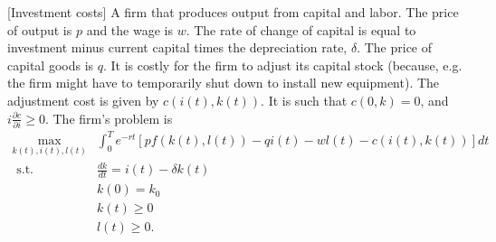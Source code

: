\begin{example}\label{ex:inv}[Investment costs]
  A firm that produces output from capital and labor. The price of
  output is $p$ and the wage is $w$. The rate of change of capital is
  equal to investment minus current capital times the depreciation
  rate, $\delta$. The price of capital goods is $q$. It is costly for
  the firm to adjust its capital stock (because, e.g. the firm might
  have to temporarily shut down to install new equipment). The
  adjustment cost is given by $c(i(t),k(t))$. It is such that $c(0,k)
  = 0$, and $i \frac{\partial c}{\partial i} \geq 0$. The firm's
  problem is
  \begin{align*}
    \max_{k(t),i(t),l(t)} & \int_0^T e^{-r t} \left[p f(k(t),l(t)) - qi(t) -
    wl(t) -
    c(i(t),k(t)) \right] dt \\
  \text{ s.t. } 
    & \frac{dk}{dt} = i(t) - \delta k(t) \\
    & k(0) = k_0 \\
    & k(t) \geq 0 \\
    & l(t) \geq 0.
  \end{align*}  
\end{example}

